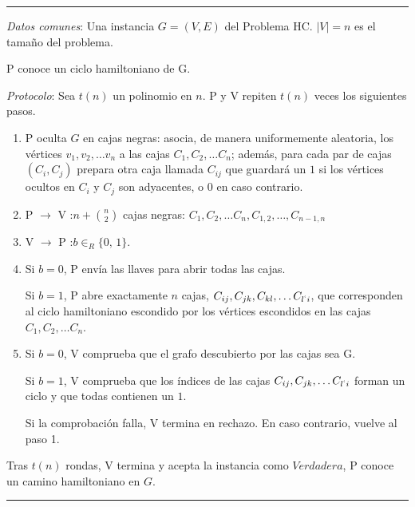 \rule{\textwidth}{1pt}
\begin{algorithm}
	
	\hfil
	
	\textit{Datos comunes}: Una instancia $G=(V,E)$ del Problema HC. $\mid V \mid = n$ es el tamaño del problema.
	
	P conoce un ciclo hamiltoniano de G.
	
	\textit{Protocolo}: Sea $t(n)$ un polinomio en $n$. P y V repiten $t(n)$ veces los siguientes pasos.
	
	\begin{enumerate}
		
		\item P oculta $G$ en cajas negras: asocia, de manera uniformemente aleatoria, los vértices $v_1, v_2, \dots v_n$ a las cajas $C_1, C_2, \dots C_n$; además, para cada par de cajas $(C_i,C_j)$ prepara otra caja llamada $C_{ij}$ que guardará un $1$ si los vértices ocultos en $C_i$ y $C_j$ son adyacentes, o $0$ en caso contrario.
		
		\item P $\rightarrow$ V :\quad $n + \binom{n}{2}$ cajas negras: $C_1, C_2, \dots C_n, C_{1,2},\dots, C_{n-1,n}$
		
		\item V $\rightarrow$ P :\quad $b \in_R \{0,\,1\}$.
		
		\item Si $b=0$, P envía las llaves para abrir todas las cajas.
		
		Si $b=1$, P abre exactamente $n$ cajas, $C_{ij}, C_{jk}, C_{kl}, \dots C_{l^`i}$, que corresponden al ciclo hamiltoniano escondido por los vértices escondidos en las cajas $C_1, C_2, \dots C_n$.
		
		\item Si $b=0$, V comprueba que el grafo descubierto por las cajas sea G.
		
		Si $b=1$, V comprueba que los índices de las cajas  $C_{ij}, C_{jk}, \dots C_{l^`i}$ forman un ciclo y que todas contienen un $1$.
		
		Si la comprobación falla, V termina en rechazo. En caso contrario, vuelve al paso 1.
		
		
	\end{enumerate}
	
	Tras $t(n)$ rondas, V termina y acepta la instancia como $Verdadera$, P conoce un camino hamiltoniano en $G$.
	\label{HCinteractive:alg}
\end{algorithm}
\rule{\textwidth}{1pt}

